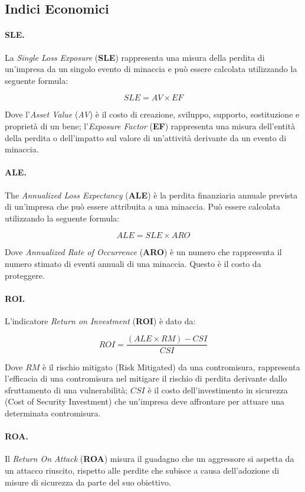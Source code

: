 \subsection{Indici Economici}

\paragraph{SLE.}
La \textit{Single Loss Exposure} (\textbf{SLE}) rappresenta una misura della
perdita di un'impresa da un singolo
evento di minaccia e può essere calcolata utilizzando la seguente formula:

\[
    SLE = AV \times  EF
\]

Dove l'\textit{Asset Value} (\textit{AV}) è il costo di creazione, sviluppo,
supporto, sostituzione e proprietà di un bene;
l'\textit{Exposure Factor} (\textbf{EF}) rappresenta una misura dell'entità della
perdita o dell'impatto sul
valore di un'attività derivante da un evento di minaccia.

\paragraph{ALE.}
The \textit{Annualized Loss Expectancy} (\textbf{ALE}) è la perdita finanziaria
annuale prevista di un'impresa che
può essere attribuita a una minaccia.
Può essere calcolata utilizzando la seguente formula:

\[
    ALE = SLE \times ARO
\]

Dove \textit{Annualized Rate of Occurrence} (\textbf{ARO}) è un numero
che rappresenta il numero stimato di eventi annuali di una
minaccia. Questo è il costo da proteggere.

\paragraph{ROI.}
L'indicatore \textit{Return on Investment} (\textbf{ROI}) è dato da:

\[
    ROI = \frac{(ALE \times RM) - CSI}{CSI}
\]

Dove \(RM\) è il rischio mitigato (Risk Mitigated) da una
contromisura, rappresenta l'efficacia di una contromisura nel
mitigare il rischio di perdita derivante dallo sfruttamento di una
vulnerabilità; \(CSI\) è il costo dell'investimento in sicurezza
(Cost of Security Investment) che un'impresa
deve affrontare per attuare una determinata contromisura.

\paragraph{ROA.}
Il \textit{Return On Attack} (\textbf{ROA}) misura il guadagno che un aggressore
si aspetta da un attacco riuscito, rispetto alle perdite che subisce a causa
dell'adozione di misure di sicurezza da parte del suo obiettivo.

